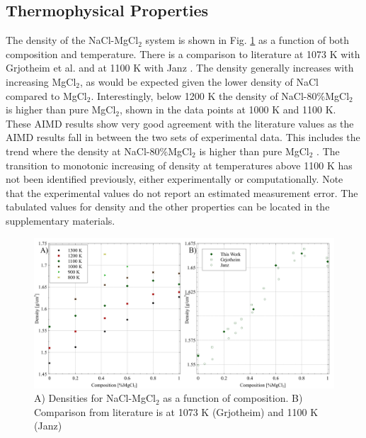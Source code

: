\documentclass[review]{elsarticle}
\begin{document}





\FloatBarrier

\subsection{Thermophysical Properties}
The density of the NaCl-MgCl$_2$ system is shown in Fig. \ref{fig:density} as a function of both composition and temperature. There is a comparison to literature at 1073 K with Grjotheim et al. \cite{grjotheim1971} and at 1100 K with Janz \cite{Janz1988}. The density generally increases with increasing MgCl$_2$, as would be expected given the lower density of NaCl compared to MgCl$_2$. Interestingly, below 1200 K the density of NaCl-80\%MgCl$_2$ is higher than pure MgCl$_2$, shown in the data points at 1000 K and 1100 K. These AIMD results show very good agreement with the literature values as the AIMD results fall in between the two sets of experimental data. This includes the trend where the density at NaCl-80\%MgCl$_2$ is higher than pure MgCl$_2$ \cite{grjotheim1971}. The transition to monotonic increasing of density at temperatures above 1100 K has not been identified previously, either experimentally or computationally. Note that the experimental values do not report an estimated measurement error. The tabulated values for density and the other properties can be located in the supplementary materials.
\begin{figure}[h]
 \centering
 \includegraphics[width=1.0\textwidth]{images/density_combined_figures.jpg} 
 \caption{A) Densities for NaCl-MgCl$_2$ as a function of composition. B) Comparison from literature is at 1073 K (Grjotheim) \cite{grjotheim1971} and 1100 K (Janz) \cite{Janz1988}}
 \label{fig:density}
\end{figure} 
\end{document}
